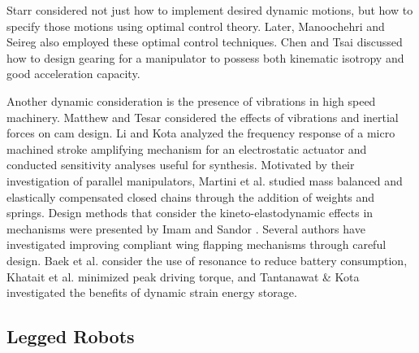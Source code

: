 \documentclass[journal]{IEEEtran}
\begin{document}
Starr \cite{starrDynamicSynthesisConstraint1973} considered not just how to implement desired dynamic motions, but how to specify those motions using optimal control theory.  
Later, Manoochehri and Seireg \cite{manoochehriComputerBasedMethodologyForm1990} also employed these optimal control techniques.  Chen and Tsai \cite{chenKinematicDynamicSynthesis1993} discussed how to design gearing for a manipulator to possess both kinematic isotropy and good acceleration capacity.


Another dynamic consideration is the presence of vibrations in high speed machinery.  
Matthew and Tesar \cite{matthewCamSystemDesign1976} considered the effects of vibrations and inertial forces on cam design.
Li and Kota \cite{liDynamicAnalysisCompliant2002} analyzed the frequency response of a micro machined stroke amplifying mechanism for an electrostatic actuator and conducted sensitivity analyses useful for synthesis.
Motivated by their investigation of parallel manipulators, Martini et al. \cite{martiniElastodynamicBehaviorBalanced2014} studied mass balanced and elastically compensated closed chains through the addition of weights and springs.
Design methods that consider the kineto-elastodynamic effects in mechanisms were presented by Imam and Sandor \cite{imamHighSpeedMechanismDesign1975}.
Several authors have investigated improving compliant wing flapping mechanisms through careful design.
Baek et al. \cite{baekEfficientResonantDrive2009} consider the use of resonance to reduce battery consumption, Khatait et al. \cite{khataitCompliantDesignFlapping2006} minimized peak driving torque, and Tantanawat \& Kota \cite{tantanawatDesignCompliantMechanisms2007} investigated the benefits of dynamic strain energy storage.


%
%
%
%
%


\subsection{Legged Robots}
\label{sec:leg_rob}
\end{document}
